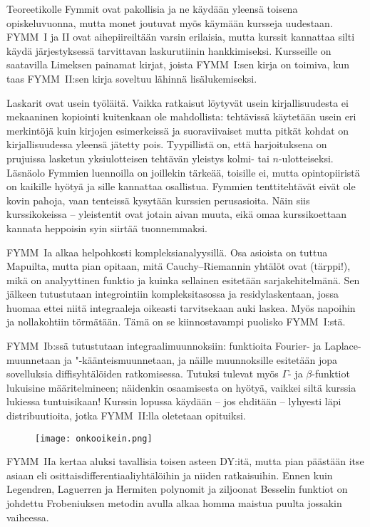 \documentclass[../ala_hataile.tex]{subfiles}
\begin{document}
	Teoreetikolle Fymmit ovat pakollisia ja
	ne käydään yleensä toisena opiskeluvuonna,
	mutta monet joutuvat myös käymään
	kursseja uudestaan. FYMM~I ja II ovat aihe\-piireiltään varsin erilaisia, mutta
	kurssit kannattaa silti käydä järjestyksessä
	tarvittavan lasku\-rutiinin hankkimiseksi.
	Kursseille on saatavilla Limeksen painamat
	kirjat, joista FYMM~I:sen kirja on toimiva,
	kun taas FYMM~II:sen kirja soveltuu
	lähinnä lisälukemiseksi.
	
	Laskarit ovat usein työläitä. Vaikka
	ratkaisut löytyvät usein kirjallisuudesta
	ei mekaaninen kopiointi kuitenkaan ole
	mahdollista: tehtävissä käytetään usein
	eri merkintöjä kuin kirjojen esimerkeissä
	ja suora\-viivaiset mutta pitkät kohdat on
	kirjallisuudessa yleensä jätetty pois. Tyypillistä
	on, että harjoituksena on prujuissa
	lasketun yksi\-ulotteisen tehtävän yleistys
	kolmi- tai $n$-ulotteiseksi. Läsnäolo Fymmien
	luennoilla on joillekin tärkeää, toisille
	ei, mutta opinto\-piiristä on kaikille hyötyä
	ja sille kannattaa osallistua.
	Fymmien tentti\-tehtävät eivät ole kovin
	pahoja, vaan tenteissä kysytään kurssien
	perusasioita. Näin siis kurssi\-kokeissa -- yleis\-tentit
	ovat jotain aivan muuta, eikä omaa
	kurssikoettaan kannata heppoisin syin siirtää
	tuonnemmaksi.
	
	FYMM~Ia alkaa helpohkosti kompleksi\-analyysillä.
	Osa asioista on tuttua Mapuilta,
	mutta pian opitaan, mitä Cauchy--Riemannin yhtälöt ovat (tärppi!), mikä on
	analyyttinen funktio ja kuinka sellainen
	esitetään sarja\-kehitelmänä. Sen jälkeen
	tutustutaan integrointiin kompleksi\-tasossa
	ja residy\-laskentaan, jossa huomaa ettei
	niitä integraaleja oikeasti tarvitsekaan auki
	laskea. Myös napoihin ja nolla\-kohtiin törmätään.
	Tämä on se kiinnostavampi puolisko
	FYMM~I:stä.
	
	FYMM~Ib:ssä tutustutaan integraali\-muunnoksiin:
	funktioita Fourier- ja Laplace-muunnetaan ja "-käänteis\-muunnetaan,
	ja näille muunnoksille esitetään jopa sovelluksia
	diffis\-yhtälöiden ratkomisessa.
	Tutuksi tulevat myös $\Gamma$- ja $\beta$-funktiot
	lukuisine määritelmineen; näidenkin
	osaamisesta on hyötyä, vaikkei siltä kurssia
	lukiessa tuntuisikaan! Kurssin lopussa
	käydään -- jos ehditään -- lyhyesti läpi distribuutioita,
	jotka FYMM~II:lla oletetaan
	opituiksi.
	
	\begin{figure}[b!]
		\texttt{[image: onkooikein.png]}
	\end{figure}
	
	FYMM~IIa kertaa aluksi tavallisia toisen
	asteen DY:itä, mutta pian päästään itse
	asiaan eli osittais\-differentiaali\-yhtälöihin
	ja niiden ratkaisuihin. Ennen kuin Legendren,
	Laguerren ja Hermiten polynomit
	ja ziljoonat Besselin funktiot on johdettu
	Frobeniuksen metodin avulla alkaa homma
	maistua puulta jossakin vaiheessa.
	
\end{document}
